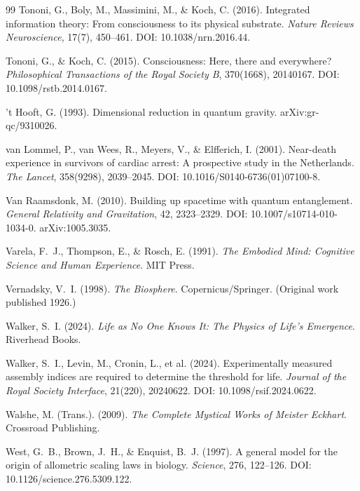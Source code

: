 \documentclass[12pt, a4paper]{article}
\begin{document}
\begin{thebibliography}{99}
Tononi, G., Boly, M., Massimini, M., \& Koch, C. (2016). Integrated information theory:
From consciousness to its physical substrate. \textit{Nature Reviews Neuroscience}, 17(7),
450--461. DOI: 10.1038/nrn.2016.44.

Tononi, G., \& Koch, C. (2015). Consciousness: Here, there and everywhere?
\textit{Philosophical Transactions of the Royal Society B}, 370(1668), 20140167.
DOI: 10.1098/rstb.2014.0167.

't Hooft, G. (1993). Dimensional reduction in quantum gravity. arXiv:gr-qc/9310026.

van Lommel, P., van Wees, R., Meyers, V., \& Elfferich, I. (2001). Near-death experience
in survivors of cardiac arrest: A prospective study in the Netherlands. \textit{The Lancet},
358(9298), 2039--2045. DOI: 10.1016/S0140-6736(01)07100-8.

Van Raamsdonk, M. (2010). Building up spacetime with quantum entanglement.
\textit{General Relativity and Gravitation}, 42, 2323--2329.
DOI: 10.1007/s10714-010-1034-0. arXiv:1005.3035.

Varela, F.~J., Thompson, E., \& Rosch, E. (1991). \textit{The Embodied Mind: Cognitive
Science and Human Experience}. MIT Press.

Vernadsky, V.~I. (1998). \textit{The Biosphere}. Copernicus/Springer. (Original work
published 1926.)

Walker, S.~I. (2024). \textit{Life as No One Knows It: The Physics of Life's Emergence}.
Riverhead Books.

Walker, S.~I., Levin, M., Cronin, L., et al. (2024). Experimentally measured assembly
indices are required to determine the threshold for life. \textit{Journal of the Royal
Society Interface}, 21(220), 20240622.
DOI: 10.1098/rsif.2024.0622.

Walshe, M. (Trans.). (2009). \textit{The Complete Mystical Works of Meister Eckhart}.
Crossroad Publishing.

West, G.~B., Brown, J.~H., \& Enquist, B.~J. (1997). A general model for the origin of
allometric scaling laws in biology. \textit{Science}, 276, 122--126.
DOI: 10.1126/science.276.5309.122.


\end{thebibliography}
\end{document}
